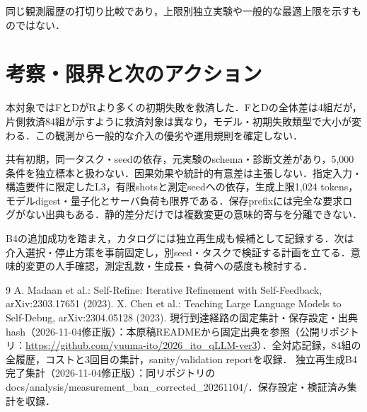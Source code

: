\documentclass[a4paper,8pt,twocolumn]{extarticle}
\begin{document}
同じ観測履歴の打切り比較であり，上限別独立実験や一般的な最適上限を示すものではない．

\section{考察・限界と次のアクション}
本対象ではFとDがRより多くの初期失敗を救済した．FとDの全体差は4組だが，片側救済84組が示すように救済対象は異なり，モデル・初期失敗類型で大小が変わる．この観測から一般的な介入の優劣や運用規則を確定しない．

共有初期，同一タスク・seedの依存，元実験のschema・診断文差があり，5,000条件を独立標本と扱わない．因果効果や統計的有意差は主張しない．指定入力・構造要件に限定したL3，有限shotsと測定seedへの依存，生成上限1,024 tokens，モデルdigest・量子化とサーバ負荷も限界である．保存prefixには完全な要求ログがない出典もある．静的差分だけでは複数変更の意味的寄与を分離できない．

B4の追加成功を踏まえ，カタログには独立再生成も候補として記録する．次は介入選択・停止方策を事前固定し，別seed・タスクで検証する計画を立てる．意味的変更の人手確認，測定乱数・生成長・負荷への感度も検討する．

\begin{thebibliography}{9}
 A. Madaan et al.: Self-Refine: Iterative Refinement with Self-Feedback, arXiv:2303.17651 (2023).
 X. Chen et al.: Teaching Large Language Models to Self-Debug, arXiv:2304.05128 (2023).
 現行到達経路の固定集計・保存設定・出典hash（2026-11-04修正版）：本原稿READMEから固定出典を参照（公開リポジトリ：\url{https://github.com/yuuma-ito/2026_ito_qLLM-ver3}）．全対応記録，84組の全履歴，コストと3回目の集計，sanity/validation reportを収録．
 独立再生成B4完了集計（2026-11-04修正版）：同リポジトリのdocs/analysis/measurement\_ban\_corrected\_20261104/．保存設定・検証済み集計を収録．
\end{thebibliography}
\end{document}
